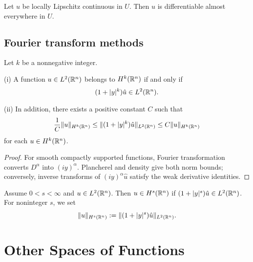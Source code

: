 \begin{theorem}
\label{thm:rademachers-theorem}

Let $u$ be locally Lipschitz continuous in $U$. Then $u$ is differentiable almost everywhere in $U$.
\end{theorem}

\subsection{Fourier transform methods}

\begin{theorem}
\label{thm:characterization-hk-fourier-transform}

Let $k$ be a nonnegative integer.

(i) A function $u \in L^2(\mathbb{R}^n)$ belongs to $H^k(\mathbb{R}^n)$ if and only if
$$(1 + |y|^k)\hat{u} \in L^2(\mathbb{R}^n).$$

(ii) In addition, there exists a positive constant $C$ such that
$$\frac{1}{C}\|u\|_{H^k(\mathbb{R}^n)} \le \|(1 + |y|^k)\hat{u}\|_{L^2(\mathbb{R}^n)} \le C\|u\|_{H^k(\mathbb{R}^n)}$$
for each $u \in H^k(\mathbb{R}^n)$.
\end{theorem}

\begin{proof}
\sketch For smooth compactly supported functions, Fourier transformation converts $D^\alpha$ into $(iy)^\alpha$. Plancherel and density give both norm bounds; conversely, inverse transforms of $(iy)^\alpha\hat u$ satisfy the weak derivative identities.
\end{proof}

\begin{definition}
\label{def:fractional-sobolev-space}

Assume $0 < s < \infty$ and $u \in L^2(\mathbb{R}^n)$. Then $u \in H^s(\mathbb{R}^n)$ if $(1 + |y|^s)\hat u \in L^2(\mathbb{R}^n)$. For noninteger $s$, we set
$$\|u\|_{H^s(\mathbb{R}^n)} := \|(1 + |y|^s)\hat u\|_{L^2(\mathbb{R}^n)}.$$
\end{definition}

\section{Other Spaces of Functions}
\label{sec:other-spaces-of-functions}

